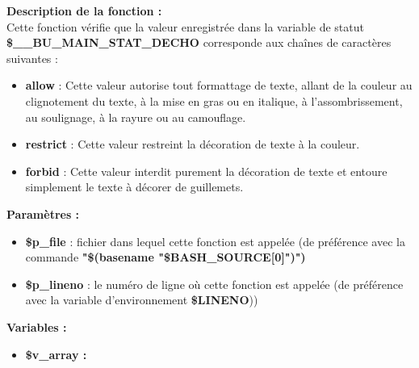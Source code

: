 \documentclass[a4paper,10pt]{article}
\begin{document}
\begin{justify}
    \textbf{Description de la fonction :}\\
    Cette fonction vérifie que la valeur enregistrée dans la variable de statut \textbf{\color{orange}\$\_\_BU\_MAIN\_STAT\_DECHO} corresponde aux chaînes de caractères suivantes :\\

    \begin{itemize}
        \item \textbf{allow} : Cette valeur autorise tout formattage de texte, allant de la couleur au clignotement du texte, à la mise en gras ou en italique, à l'assombrissement, au soulignage, à la rayure ou au camouflage.\\

        \item \textbf{restrict} : Cette valeur restreint la décoration de texte à la couleur.\\

        \item \textbf{forbid} : Cette valeur interdit purement la décoration de texte et entoure simplement le texte à décorer de guillemets.
    \end{itemize}

\end{justify}

\begin{justify}
    \textbf{Paramètres :}

    \begin{itemize}
        \item \color{orange}\textbf{\$p\_file}\color{white} : fichier dans lequel cette fonction est appelée (de préférence avec la commande \textbf{"\$(\color{gray}basename \color{white}"\color{orange}\$BASH\_SOURCE[0]\color{white}")")}\\

        \item \color{orange}\textbf{\$p\_lineno}\color{white} : le numéro de ligne où cette fonction est appelée (de préférence avec la variable d'environnement \textbf{\color{orange}\$LINENO}))
    \end{itemize}
\end{justify}

\begin{justify}
    \textbf{Variables :}

    \begin{itemize}
        \item \textbf{\color{orange}\$v\_array\color{white} :}
    \end{itemize}
\end{justify}
\end{document}

